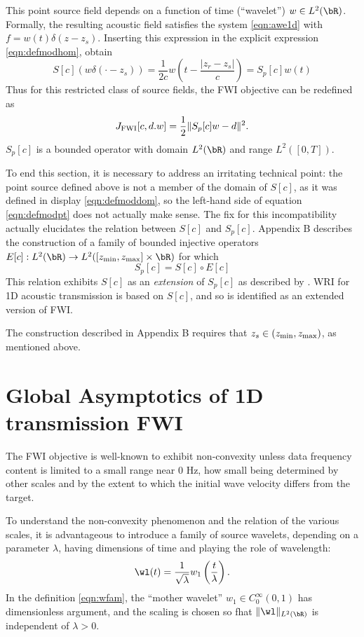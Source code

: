 This point source field depends on a function of time (``wavelet'')
$w \in L^2(\bR)$. Formally, the resulting acoustic field satisfies the
system \ref{eqn:awe1d} with $f=w(t)\delta(z-z_s)$. Inserting this
expression in the explicit expression \ref{eqn:defmodhom}, obtain
\begin{equation}
  \label{eqn:defmodpt}
  S[c](w\delta(\cdot-z_s)) = \frac{1}{2c}w\left(t - \frac{|z_r-z_s|}{c}\right) = S_p[c]w(t)
\end{equation}
Thus for this restricted class of source fields, the FWI objective can be redefined as
\begin{equation}
  \label{eqn:deffwipt}
  J_{\rm FWI}[c,d.w] = \frac{1}{2}\|S_p[c]w -d\|^2.
\end{equation}
$S_p[c]$ is a bounded operator with domain $L^2(\bR)$ and range $L^2([0,T])$. 

To end this section, it is necessary to address an irritating
technical point: the point source defined above is not a member of the
domain of $S[c]$, as it was defined in display \ref{eqn:defmoddom}, so
the left-hand side of equation \ref{eqn:defmodpt} does not actually
make sense. The fix for this incompatibility actually elucidates the
relation between $S[c]$ and $S_p[c]$. Appendix B describes the
construction of a family of bounded injective operators  $E[c]: L^2(\bR) \rightarrow L^2([z_{\rm min},z_{\rm max}] \times \bR)$ for which
\begin{equation}
  \label{eqn:ext}
  S_p[c] = S[c] \circ E[c]
\end{equation}
This relation exhibits $S[c]$ as an {\em extension} of $S_p[c]$ as
described by \cite{Symes:09}. WRI for 1D acoustic transmission is
based on $S[c]$, and so is identified as an extended version of FWI.

The construction described in Appendix B requires that $z_s \in
(z_{\rm min},z_{\rm max})$, as mentioned above.

\section{Global Asymptotics of 1D transmission FWI}
The FWI objective is well-known to exhibit non-convexity unless
data frequency content is limited to a small range near 0 Hz, how
small being determined by other scales and by the extent to which the
initial wave velocity differs from the target.

To understand the non-convexity phenomenon and the
relation of the various scales, it is advantageous to introduce a
family of source wavelets, depending on a parameter $\lambda$, having
dimensions of time and playing
the role of wavelength:
\begin{equation}
  \label{eqn:wfam}
  \wl(t) = \frac{1}{\sqrt{\lambda}}w_1\left(\frac{t}{\lambda}\right).
\end{equation}
In the definition \ref{eqn:wfam}, the ``mother wavelet'' $w_1\in
C_0^{\infty}(0,1)$ has dimensionless argument, and the scaling is chosen so fhat
$\|\wl\|_{L^2(\bR)}$ is independent of $\lambda>0$.

